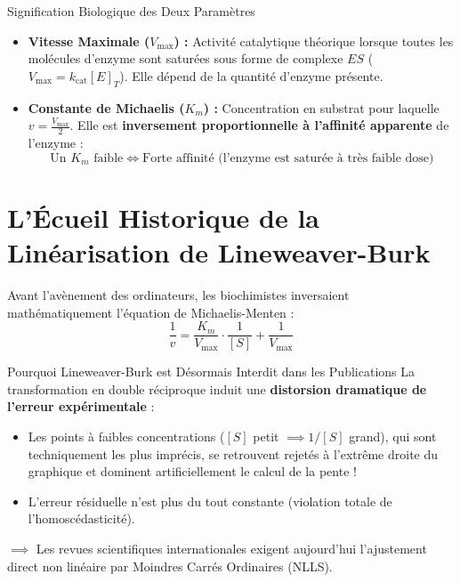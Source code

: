 \documentclass[11pt,a4paper]{article}
\begin{document}
\begin{biobox}{Signification Biologique des Deux Paramètres}
\begin{itemize}[leftmargin=*, label=\faCheck]
  \item \textbf{Vitesse Maximale ($V_{\max}$) :} Activité catalytique théorique lorsque toutes les molécules d'enzyme sont saturées sous forme de complexe $ES$ ($V_{\max} = k_{\text{cat}} [E]_T$). Elle dépend de la quantité d'enzyme présente.
  \item \textbf{Constante de Michaelis ($K_m$) :} Concentration en substrat pour laquelle $v = \frac{V_{\max}}{2}$. Elle est \textbf{inversement proportionnelle à l'affinité apparente} de l'enzyme :
  \begin{equation*}
    \text{Un } K_m \text{ faible} \iff \text{Forte affinité (l'enzyme est saturée à très faible dose)}
  \end{equation*}
\end{itemize}
\end{biobox}

\section{L'Écueil Historique de la Linéarisation de Lineweaver-Burk}

Avant l'avènement des ordinateurs, les biochimistes inversaient mathématiquement l'équation de Michaelis-Menten :
\begin{equation*}
  \frac{1}{v} = \frac{K_m}{V_{\max}} \cdot \frac{1}{[S]} + \frac{1}{V_{\max}}
\end{equation*}

\begin{warnbox}{Pourquoi Lineweaver-Burk est Désormais Interdit dans les Publications}
La transformation en double réciproque induit une \textbf{distorsion dramatique de l'erreur expérimentale} :
\begin{itemize}[leftmargin=*, label=\faTimesCircle]
  \item Les points à faibles concentrations ($[S]$ petit $\implies 1/[S]$ grand), qui sont techniquement les plus imprécis, se retrouvent rejetés à l'extrême droite du graphique et dominent artificiellement le calcul de la pente !
  \item L'erreur résiduelle n'est plus du tout constante (violation totale de l'homoscédasticité).
\end{itemize}
$\implies$ Les revues scientifiques internationales exigent aujourd'hui l'ajustement direct non linéaire par Moindres Carrés Ordinaires (NLLS).
\end{warnbox}
\end{document}
